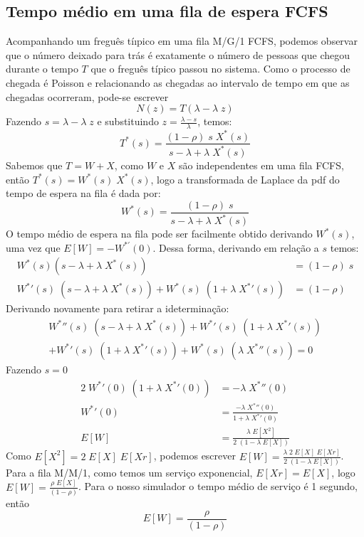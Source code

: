 \documentclass[a4paper]{article}
\newcommand{\E}[1]{E\!\left[#1\right]}
\begin{document}
\subsection{Tempo médio em uma fila de espera FCFS}

Acompanhando um freguês tíıpico em uma fila M/G/1 FCFS,
podemos observar que o número deixado para trás é
exatamente o número de pessoas que chegou
durante o tempo \(T\) que o freguês típico passou no sistema.
Como o processo de chegada é Poisson
e relacionando as chegadas ao intervalo de tempo em
que as chegadas ocorreram,
pode-se escrever
\[
    N(z) = T(\lambda - \lambda \; z)
\]
Fazendo \(s = \lambda - \lambda \; z\)
e substituindo \(z = \frac{\lambda - s}{\lambda}\),
temos:
\[
    T^*(s) =
    \frac{(1 - \rho)\; s \; X^*(s)}{s - \lambda + \lambda \; X^*(s)}
\]
Sabemos que \(T = W + X\), como \(W\) e \(X\)
são independentes em uma fila FCFS,
então  \(T^*(s) =  W^*(s) \; X^*(s)\),
logo a transformada de Laplace
da pdf do tempo de espera na fila é dada por:
\[
    W^*(s) = \frac{(1 - \rho) \; s}{s - \lambda + \lambda \; X^*(s)}
\]
O tempo médio de espera na fila
pode ser facilmente obtido derivando \(W^{*}(s)\),
uma vez que \(E[W] = - W^{*'}(0)\).
Dessa forma, derivando em relação a \(s\) temos:
\begin{align*}
    W^*(s)(s - \lambda + \lambda \; X^*(s)) &= (1 - \rho) \; s \\
    {W^*}'(s) \; (s - \lambda + \lambda \; X^*(s))
        + W^*(s) \; (1 + \lambda \; {X^*}'(s)) &= (1 - \rho)
\end{align*}
Derivando novamente para retirar a ideterminação:
\begin{align*}
    {W^*}''(s) \; (s - \lambda + \lambda \; X^*(s))
        + {W^*}'(s) \; (1 + \lambda \; {X^*}'(s)) \\
        + {W^*}'(s) \; (1 + \lambda \; {X^*}'(s))
        + W^*(s) \; (\lambda \; {X^*}''(s)) = 0
\end{align*}
Fazendo \(s = 0\)
\begin{align*}
    2 \; {W^*}'(0) \; (1 + \lambda \; {X^*}'(0))
        &= - \lambda \; {X^*}''(0) \\
    {W^*}'(0)
        &= \frac{-\lambda \; {X^*}''(0)}{1 + \lambda \; {X^*}'(0)} \\
    \E{W} &= \frac{\lambda \; \E{X^2}}{2 \; (1 - \lambda \; \E{X})}
\end{align*}
Como \(\E{X^2} = 2 \; \E{X} \; \E{Xr}\),
podemos escrever
\(
    \E{W} = \frac{\lambda \; 2 \; \E{X} \; \E{Xr}}{2
        \; (1 - \lambda \; \E{X})}
\).
Para a fila M/M/1,
como temos um serviço exponencial,
\(E[Xr] = E[X]\),
logo \(\E{W} = \frac{\rho \; \E{X}}{(1 - \rho)}\).
Para o nosso simulador o tempo médio de serviço é 1 segundo,
então
\[
    \E{W} = \frac{\rho}{(1 - \rho)}
\]
\end{document}
